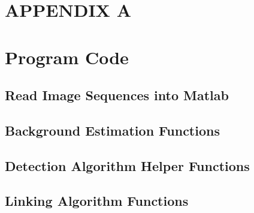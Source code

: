 \documentclass{article}
\begin{document}



 \newpage
\onecolumn
\appendix
\setcounter{table}{0}
\setcounter{figure}{0}
\setcounter{subsection}{0}
\makeatletter \renewcommand{\thefigure}{A.\@arabic\c@figure} \renewcommand{\thetable}{A.\@arabic\c@table} \renewcommand{\thesection}{A.\@arabic\c@section} \makeatother
\section*{APPENDIX A}

\section{Program Code}
\label{sec:code}

\subsection{Read Image Sequences into Matlab}
\label{code:read}





\subsection{Background Estimation Functions}
\label{code:background}





\subsection{Detection Algorithm Helper Functions}
\label{code:detection}















\subsection{Linking Algorithm Functions}
\end{document}
